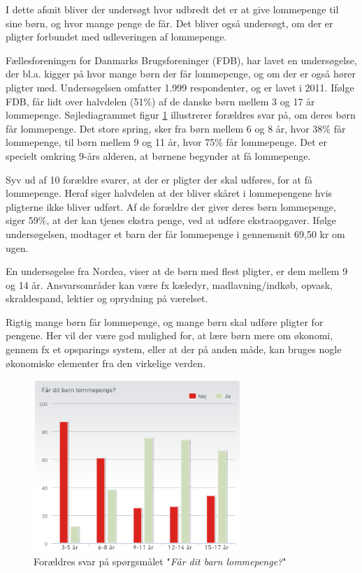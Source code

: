 I dette afsnit bliver der undersøgt hvor udbredt det er at give lommepenge til sine børn, og hvor mange penge de får. Det bliver også undersøgt, om der er pligter forbundet med udleveringen af lommepenge.

Fællesforeningen for Danmarks Brugsforeninger (FDB), har lavet en undersøgelse, der bl.a. kigger på hvor mange børn der får lommepenge, og om der er også hører pligter med. \cite{FDB1} Undersøgelsen omfatter 1.999 respondenter, og er lavet i 2011.
Ifølge FDB, får lidt over halvdelen (51\%) af de danske børn mellem 3 og 17 år lommepenge. Søjlediagrammet figur \ref{FaarBarnLommepenge} illustrerer forældres svar på, om deres børn får lommepenge. Det store spring, sker fra børn mellem 6 og 8 år, hvor 38\% får lommepenge, til børn mellem 9 og 11 år, hvor 75\% får lommepenge. Det er specielt omkring 9-års alderen, at børnene begynder at få lommepenge. 

Syv ud af 10 forældre svarer, at der er pligter der skal udføres, for at få lommepenge. Heraf siger halvdelen at der bliver skåret i lommepengene hvis pligterne ikke bliver udført. Af de forældre der giver deres børn lommepenge, siger 59\%, at der kan tjenes ekstra penge, ved at udføre ekstraopgaver.
Ifølge undersøgelsen, modtager et barn der får lommepenge i gennemsnit 69,50 kr om ugen.

En undersøgelse fra Nordea, viser at de børn med flest pligter, er dem mellem 9 og 14 år. Ansvarsområder kan være fx kæledyr, madlavning/indkøb, opvask, skraldespand, lektier og oprydning på værelset. \cite{Nordea1}

Rigtig mange børn får lommepenge, og mange børn skal udføre pligter for pengene. Her vil der være god mulighed for, at lære børn mere om økonomi, gennem fx et opsparings system, eller at der på anden måde, kan bruges nogle økonomiske elementer fra den virkelige verden.
\begin{figure}[htb]
\centering
\includegraphics[width=0.7\textwidth]{Billeder/FaarBarnLommepenge.png}
\caption{Forældres svar på spørgsmålet "\textit{Får dit barn lommepenge?}"}
\label{FaarBarnLommepenge}
\end{figure}